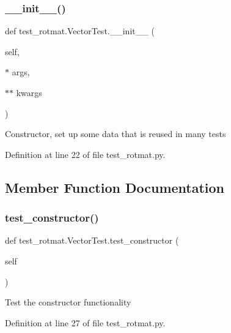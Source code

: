 \subsubsection{\texorpdfstring{\_\_init\_\_()}{\_\_init\_\_()}}
{\footnotesize\ttfamily def test\+\_\+rotmat.\+Vector\+Test.\+\_\+\+\_\+init\+\_\+\+\_\+ (\begin{DoxyParamCaption}\item[{}]{self,  }\item[{$\ast$}]{args,  }\item[{$\ast$$\ast$}]{kwargs }\end{DoxyParamCaption})}

\begin{DoxyVerb}Constructor, set up some data that is reused in many tests\end{DoxyVerb}
 

Definition at line 22 of file test\+\_\+rotmat.\+py.



\subsection{Member Function Documentation}
\mbox{\label{classtest__rotmat_1_1VectorTest_a8b76e1cd6c7eb26849aa5d8722812d94}} 
\subsubsection{\texorpdfstring{test\_constructor()}{test\_constructor()}}
{\footnotesize\ttfamily def test\+\_\+rotmat.\+Vector\+Test.\+test\+\_\+constructor (\begin{DoxyParamCaption}\item[{}]{self }\end{DoxyParamCaption})}

\begin{DoxyVerb}Test the constructor functionality\end{DoxyVerb}
 

Definition at line 27 of file test\+\_\+rotmat.\+py.

\mbox{\label{classtest__rotmat_1_1VectorTest_a00794bb3325f4433875679a6872824ef}} 
